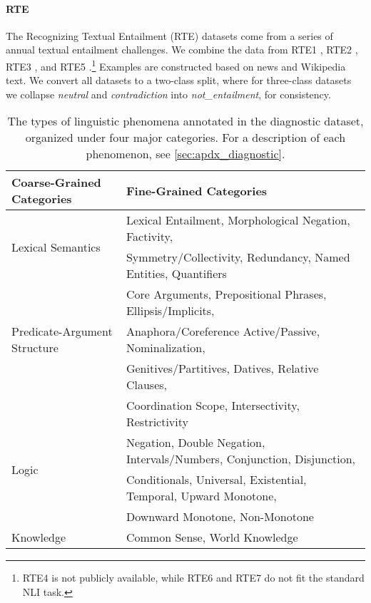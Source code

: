 \paragraph{RTE}
The Recognizing Textual Entailment (RTE) datasets come from a series of annual textual entailment challenges. We combine the data from RTE1 \citep{dagan2006pascal}, RTE2 \citep{bar2006second}, RTE3 \citep{giampiccolo2007third}, and RTE5 \citep{bentivogli2009fifth}.\footnote{RTE4 is not publicly available, while RTE6 and RTE7 do not fit the standard NLI task.} Examples are constructed based on news and Wikipedia text. 
We convert all datasets to a two-class split, where for three-class datasets we collapse \textit{neutral} and \textit{contradiction} into \textit{not\_entailment}, for consistency.

\begin{table*}[t]
\small
\centering
\begin{tabular}{ll}
\toprule
\textbf{Coarse-Grained Categories} & \textbf{Fine-Grained Categories} \\
\midrule
\multirow{2}{*}{Lexical Semantics} & Lexical Entailment, Morphological Negation, Factivity, \\ & Symmetry/Collectivity, Redundancy, Named Entities, Quantifiers \\
\midrule
\multirow{3}{*}{Predicate-Argument Structure} & Core Arguments, Prepositional Phrases, Ellipsis/Implicits, \\ & Anaphora/Coreference
Active/Passive, Nominalization, \\ & Genitives/Partitives, Datives, Relative Clauses, \\
& Coordination Scope, Intersectivity, Restrictivity \\
\midrule
\multirow{2}{*}{Logic} & Negation, Double Negation, Intervals/Numbers, Conjunction, Disjunction, \\ & Conditionals, Universal, Existential, Temporal, Upward Monotone, \\ & Downward Monotone, Non-Monotone \\
\midrule
Knowledge & Common Sense, World Knowledge\\

\bottomrule
\end{tabular}
\caption{The types of linguistic phenomena annotated in the diagnostic dataset, organized under four major categories. For a description of each phenomenon, see \autoref{sec:apdx_diagnostic}.}
\label{tab:analysis-categories}
\end{table*}

